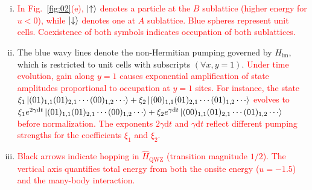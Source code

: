\documentclass[longbibliography, aps, prx, amsmath, amssymb, amsfonts, twocolumn,superscriptaddress, footinbib]{revtex4-1}
\begin{document}
	\begin{enumerate}[(i)]
		\item \textcolor{red}{
		In Fig.~\ref{fig:02}(e), $\ket{\uparrow}$ denotes a particle at the 
		$B$ sublattice (higher energy for $u<0$), while $\ket{\downarrow}$ denotes 
		one at $A$ sublattice. Blue spheres represent unit cells. Coexistence of 
		both symbols indicates occupation of both sublattices.
		}
		\item The blue wavy lines denote the non-Hermitian pumping governed by $\hat{H}_{\text{im}}$, which is restricted to unit cells with subscripts $(\forall x,y=1)$. 
		\textcolor{red}{
		Under time evolution, gain along $y=1$ causes exponential amplification 
		of state amplitudes proportional to occupation at $y=1$ sites.
		For instance, the state $\xi_1 \ket{(01)_{1,1}(01)_{2,1}\cdots(00)_{1,2}\cdots} + \xi_2\ket{(00)_{1,1}(01)_{2,1}\cdots(01)_{1,2}\cdots}$ evolves to $\xi_1 e^{2\gamma \mathrm{d}t} \ket{(01)_{1,1}(01)_{2,1}\cdots(00)_{1,2}\cdots} + \xi_2 e^{\gamma \mathrm{d}t} \ket{(00)_{1,1}(01)_{2,1}\cdots(01)_{1,2}\cdots}$ before normalization. The exponents $2\gamma \mathrm{d}t$ and $\gamma \mathrm{d}t$ reflect different pumping strengths for the coefficients $\xi_1$ and $\xi_2$. 
		}
		\item \textcolor{red}{Black arrows indicate hopping in $\hat{H}_{\text{QWZ}}$ (transition magnitude $1/2$). The vertical axis quantifies total energy from both the onsite energy ($u=-1.5$) and the many-body interaction.}
	\end{enumerate}
\end{document}

